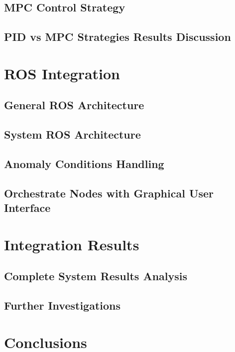 \documentclass[11pt]{report} %
\begin{document}
\section{MPC Control Strategy}

\section{PID vs MPC Strategies Results Discussion}

\chapter{ROS Integration}

\section{General ROS Architecture}

\section{System ROS Architecture}

\section{Anomaly Conditions Handling}

\section{Orchestrate Nodes with Graphical User Interface}

\chapter{Integration Results}

\section{Complete System Results Analysis}

\section{Further Investigations}

\chapter{Conclusions}
\end{document}
